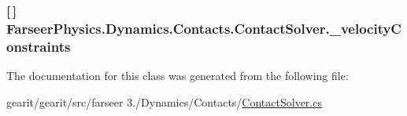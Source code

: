 \hypertarget{class_farseer_physics_1_1_dynamics_1_1_contacts_1_1_contact_solver_a79e50d0893b382d63029a1bbbae6471e}{
\subsubsection[{\+\_\+velocity\+Constraints}]{ \mbox{[}$\,$\mbox{]} Farseer\+Physics.\+Dynamics.\+Contacts.\+Contact\+Solver.\+\_\+velocity\+Constraints}}\label{class_farseer_physics_1_1_dynamics_1_1_contacts_1_1_contact_solver_a79e50d0893b382d63029a1bbbae6471e}


The documentation for this class was generated from the following file\+:\begin{DoxyCompactItemize}
\item 
gearit/gearit/src/farseer 3./\+Dynamics/\+Contacts/\hyperlink{_contact_solver_8cs}{Contact\+Solver.\+cs}\end{DoxyCompactItemize}
